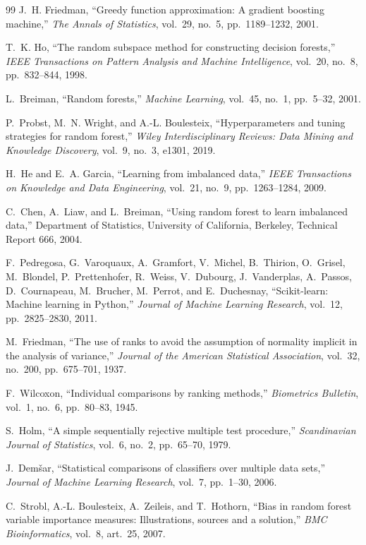 \documentclass[conference,10pt]{IEEEtran}
\begin{document}
\begin{thebibliography}{99}
J.~H. Friedman, ``Greedy function approximation: A gradient boosting machine,'' \emph{The Annals of Statistics}, vol.~29, no.~5, pp.~1189--1232, 2001.

T.~K. Ho, ``The random subspace method for constructing decision forests,'' \emph{IEEE Transactions on Pattern Analysis and Machine Intelligence}, vol.~20, no.~8, pp.~832--844, 1998.

L.~Breiman, ``Random forests,'' \emph{Machine Learning}, vol.~45, no.~1, pp.~5--32, 2001.

P.~Probst, M.~N. Wright, and A.-L. Boulesteix, ``Hyperparameters and tuning strategies for random forest,'' \emph{Wiley Interdisciplinary Reviews: Data Mining and Knowledge Discovery}, vol.~9, no.~3, e1301, 2019.

H.~He and E.~A. Garcia, ``Learning from imbalanced data,'' \emph{IEEE Transactions on Knowledge and Data Engineering}, vol.~21, no.~9, pp.~1263--1284, 2009.

C.~Chen, A.~Liaw, and L.~Breiman, ``Using random forest to learn imbalanced data,'' Department of Statistics, University of California, Berkeley, Technical Report 666, 2004.

F.~Pedregosa, G.~Varoquaux, A.~Gramfort, V.~Michel, B.~Thirion, O.~Grisel, M.~Blondel, P.~Prettenhofer, R.~Weiss, V.~Dubourg, J.~Vanderplas, A.~Passos, D.~Cournapeau, M.~Brucher, M.~Perrot, and E.~Duchesnay, ``Scikit-learn: Machine learning in Python,'' \emph{Journal of Machine Learning Research}, vol.~12, pp.~2825--2830, 2011.

M.~Friedman, ``The use of ranks to avoid the assumption of normality implicit in the analysis of variance,'' \emph{Journal of the American Statistical Association}, vol.~32, no.~200, pp.~675--701, 1937.

F.~Wilcoxon, ``Individual comparisons by ranking methods,'' \emph{Biometrics Bulletin}, vol.~1, no.~6, pp.~80--83, 1945.

S.~Holm, ``A simple sequentially rejective multiple test procedure,'' \emph{Scandinavian Journal of Statistics}, vol.~6, no.~2, pp.~65--70, 1979.

J.~Dem\v{s}ar, ``Statistical comparisons of classifiers over multiple data sets,'' \emph{Journal of Machine Learning Research}, vol.~7, pp.~1--30, 2006.

C.~Strobl, A.-L. Boulesteix, A.~Zeileis, and T.~Hothorn, ``Bias in random forest variable importance measures: Illustrations, sources and a solution,'' \emph{BMC Bioinformatics}, vol.~8, art.~25, 2007.

\end{thebibliography}
\end{document}
